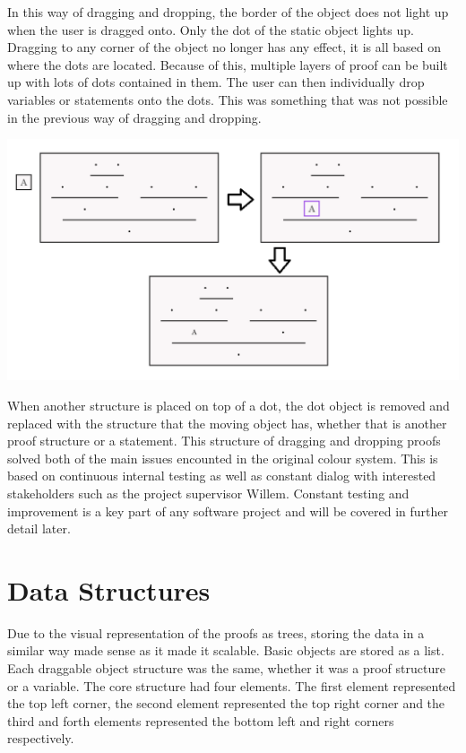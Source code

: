 In this way of dragging and dropping, the border of the object does not light up when the user is dragged onto. Only the dot of the static object lights up. Dragging to any corner of the object no longer has any effect, it is all based on where the dots are located. Because of this, multiple layers of proof can be built up with lots of dots contained in them. The user can then individually drop variables or statements onto the dots. This was something that was not possible in the previous way of dragging and dropping.

\centerline{\includegraphics[scale=0.5]{dotsdnd}}

When another structure is placed on top of a dot, the dot object is removed and replaced with the structure that the moving object has, whether that is another proof structure or a statement. This structure of dragging and dropping proofs solved both of the main issues encounted in the original colour system. This is based on continuous internal testing as well as constant dialog with interested stakeholders such as the project supervisor Willem. Constant testing and improvement is a key part of any software project and will be covered in further detail later.  

\section{Data Structures}

Due to the visual representation of the proofs as trees, storing the data in a similar way made sense as it made it scalable. Basic objects are stored as a list. Each draggable object structure was the same, whether it was a proof structure or a variable. The core structure had four elements. The first element represented the top left corner, the second element represented the top right corner and the third and forth elements represented the bottom left and right corners respectively.

